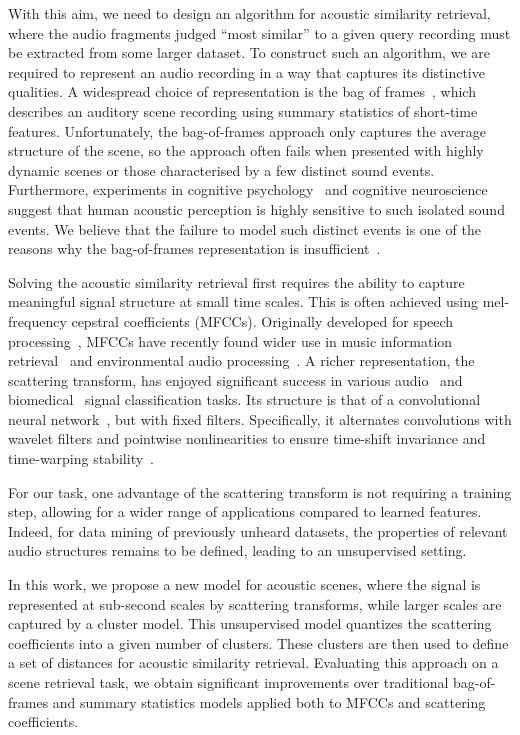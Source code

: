 \documentclass[smallextended]{svjour3}
\begin{document}
With this aim, we need to design an algorithm for acoustic similarity retrieval, where the audio fragments judged ``most similar'' to a given query recording must be extracted from some larger dataset. To construct such an algorithm, we are required to represent an audio recording in a way that captures its distinctive qualities. A widespread choice of representation is the bag of frames~\cite{aucouturier2007bag}, which describes an auditory scene recording using summary statistics of short-time features. Unfortunately, the bag-of-frames approach only captures the average structure of the scene, so the approach often fails when presented with highly dynamic scenes or those characterised by a few distinct sound events. Furthermore, experiments in cognitive psychology~\cite{dubois2006cognitive} and cognitive neuroscience~\cite{nelken2004processing} suggest that human acoustic perception is highly sensitive to such isolated sound events. We believe that the failure to model such distinct events is one of the reasons why the bag-of-frames representation is insufficient~\cite{lagrange:hal-01082501}.

Solving the acoustic similarity retrieval first requires the ability to capture meaningful signal structure at small time scales.
This is often achieved using mel-frequency cepstral coefficients (MFCCs).
Originally developed for speech processing~\cite{davis-mermelstein}, MFCCs have recently found wider use in music information retrieval~\cite{logan} and environmental audio processing~\cite{aucouturier2007bag}.
A richer representation, the scattering transform, has enjoyed significant success in various audio~\cite{Anden2014} and biomedical~\cite{chudacek} signal classification tasks.
Its structure is that of a convolutional neural network~\cite{lee,lostanlen-deep-spiral,soundnet,arandjelovic-zisserman}, but with fixed filters.
Specifically, it alternates convolutions with wavelet filters and pointwise nonlinearities to ensure time-shift invariance and time-warping stability~\cite{Mallat2012}.

For our task, one advantage of the scattering transform is not requiring a training step, allowing for a wider range of applications compared to learned features. Indeed, for data mining of previously unheard datasets, the properties of relevant audio structures remains to be defined, leading to an unsupervised setting.

In this work, we propose a new model for acoustic scenes, where the signal is represented at sub-second scales by scattering transforms, while larger scales are captured by a cluster model. This unsupervised model quantizes the scattering coefficients into a given number of clusters. These clusters are then used to define a set of distances for acoustic similarity retrieval. Evaluating this approach on a scene retrieval task, we obtain significant improvements over traditional bag-of-frames and summary statistics models applied both to MFCCs and scattering coefficients.
\end{document}
